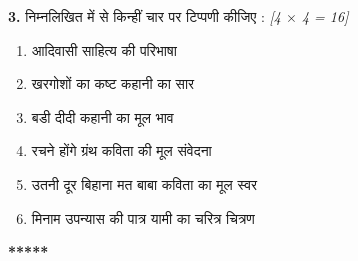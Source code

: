 \documentclass[11pt,a4paper]{article}
\newcommand{\pts}[1]{\hfill \textit{[#1]}}
\begin{document}
\bigskip

\noindent \textbf{3.} निम्नलिखित में से किन्हीं चार पर टिप्पणी कीजिए : \pts{4 $\times$ 4 = 16}

\begin{enumerate}[label=(\roman*)]
  \item आदिवासी साहित्य की परिभाषा
  \item खरगोशों का कष्ट कहानी का सार
  \item बडी दीदी कहानी का मूल भाव
  \item रचने होंगे ग्रंथ कविता की मूल संवेदना
  \item उतनी दूर बिहाना मत बाबा कविता का मूल स्वर
  \item मिनाम उपन्यास की पात्र यामी का चरित्र चित्रण
\end{enumerate}

\bigskip
\begin{center}
  \textbf{*****}
\end{center}
\end{document}
